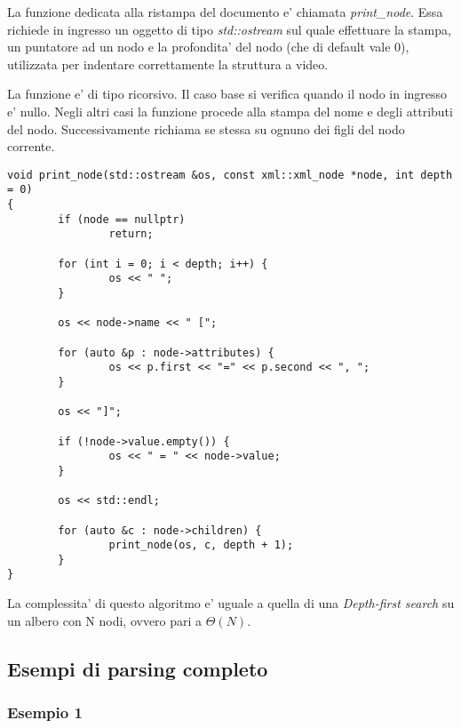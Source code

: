 \documentclass[italian,a4paper]{article}
\begin{document}
La funzione dedicata alla ristampa del documento e' chiamata \emph{print_node}.
Essa richiede in ingresso un oggetto di tipo \emph{std::ostream} sul quale
effettuare la stampa, un puntatore ad un nodo e la profondita' del nodo (che di
default vale 0), utilizzata per indentare correttamente la struttura a video.

La funzione e' di tipo ricorsivo. Il caso base si verifica quando il nodo in
ingresso e' nullo. Negli altri casi la funzione procede alla stampa del nome e
degli attributi del nodo. Successivamente richiama se stessa su ognuno dei figli
del nodo corrente.

\begin{verbatim}
void print_node(std::ostream &os, const xml::xml_node *node, int depth = 0)
{
        if (node == nullptr)
                return;

        for (int i = 0; i < depth; i++) {
                os << " ";
        }

        os << node->name << " [";

        for (auto &p : node->attributes) {
                os << p.first << "=" << p.second << ", ";
        }   

        os << "]";

        if (!node->value.empty()) {
                os << " = " << node->value;
        }   

        os << std::endl;

        for (auto &c : node->children) {
                print_node(os, c, depth + 1); 
        }   
}
\end{verbatim}

La complessita' di questo algoritmo e' uguale a quella di una \emph{Depth-first
search} su un albero con N nodi, ovvero pari a $ \Theta(N) $.

\subsection{Esempi di parsing completo}

\subsubsection{Esempio 1}
\end{document}

